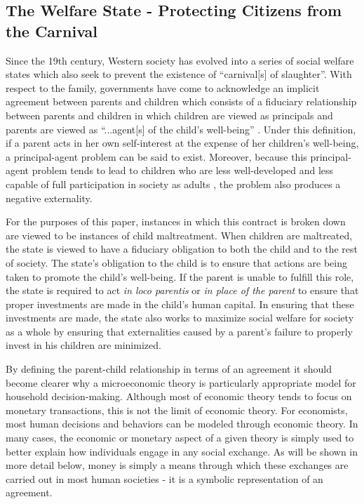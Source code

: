 \documentclass[1p, review]{elsarticle}\usepackage[]{graphicx}\usepackage[]{color}
\begin{document}
\subsection{The Welfare State - Protecting Citizens from the Carnival}

Since the 19th century, Western society has evolved into a series of social welfare states which also seek to prevent the existence of ``carnival[s] of slaughter''. With respect to the family, governments have come to acknowledge an implicit agreement between parents and children which consists of a fiduciary relationship between parents and children in which children are viewed as principals and parents are viewed as ``...agent[s] of the child's well-being'' \citep[p. 57,][]{TestaAndPoertner2010}. Under this definition, if a parent acts in her own self-interest at the expense of her children's well-being, a principal-agent problem can be said to exist. Moreover, because this principal-agent problem tends to lead to children who are less well-developed and less capable of full participation in society as adults \citep[e.g.][]{BarroEtAl1986}, the problem also produces a negative externality. 

For the purposes of this paper, instances in which this contract is broken down are viewed to be instances of child maltreatment. When children are maltreated, the state is viewed to have a fiduciary obligation to both the child and to the rest of society. The state's obligation to the child is to ensure that actions are being taken to promote the child's well-being. If the parent is unable to fulfill this role, the state is required to act \emph{in loco parentis} or \emph{in place of the parent} to ensure that proper investments are made in the child's human capital. In ensuring that these investments are made, the state also works to maximize social welfare for society as a whole by ensuring that externalities caused by a parent's failure to properly invest in his children are minimized. 

By defining the parent-child relationship in terms of an agreement it should become clearer why a microeconomic theory is particularly appropriate model for household decision-making. Although most of economic theory tends to focus on monetary transactions, this is not the limit of economic theory. For economists, most human decisions and behaviors can be modeled through economic theory. In many cases, the economic or monetary aspect of a given theory is simply used to better explain how individuals engage in any social exchange. As will be shown in more detail below, money is simply a means through which these exchanges are carried out in most human societies - it is a symbolic representation of an agreement.
\end{document}
